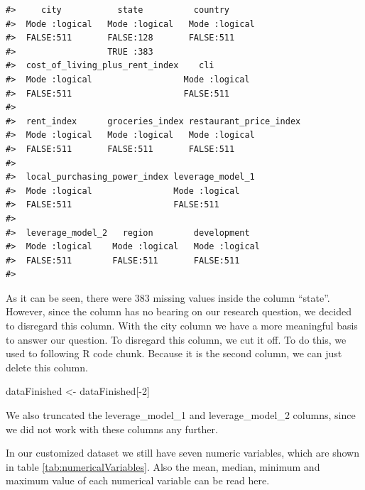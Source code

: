 \documentclass[
  11pt,
  a4paper,
  twoside]{scrbook}
\newenvironment{Shaded}{\begin{snugshade}}{\end{snugshade}}
\newcommand{\DecValTok}[1]{\textcolor[rgb]{0.00,0.00,0.81}{#1}}
\newcommand{\NormalTok}[1]{#1}
\newcommand{\OtherTok}[1]{\textcolor[rgb]{0.56,0.35,0.01}{#1}}
\newcommand{\SpecialCharTok}[1]{\textcolor[rgb]{0.00,0.00,0.00}{#1}}
\begin{document}
\begin{verbatim}
#>     city           state          country       
#>  Mode :logical   Mode :logical   Mode :logical  
#>  FALSE:511       FALSE:128       FALSE:511      
#>                  TRUE :383                      
#>  cost_of_living_plus_rent_index    cli         
#>  Mode :logical                  Mode :logical  
#>  FALSE:511                      FALSE:511      
#>                                                
#>  rent_index      groceries_index restaurant_price_index
#>  Mode :logical   Mode :logical   Mode :logical         
#>  FALSE:511       FALSE:511       FALSE:511             
#>                                                        
#>  local_purchasing_power_index leverage_model_1
#>  Mode :logical                Mode :logical   
#>  FALSE:511                    FALSE:511       
#>                                               
#>  leverage_model_2   region        development    
#>  Mode :logical    Mode :logical   Mode :logical  
#>  FALSE:511        FALSE:511       FALSE:511      
#> 
\end{verbatim}

As it can be seen, there were \(383\) missing values inside the column ``state''.
However, since the column has no bearing on our research question, we decided to disregard this column. With the city column we have a more meaningful basis to answer our question.
To disregard this column, we cut it off. To do this, we used to following R code chunk. Because it is the second column, we can just delete this column.

\linespread{1}

\begin{Shaded}
\begin{Highlighting}[]
\NormalTok{dataFinished }\OtherTok{\textless{}{-}}\NormalTok{ dataFinished[}\SpecialCharTok{{-}}\DecValTok{2}\NormalTok{]}
\end{Highlighting}
\end{Shaded}

\linespread{1}

We also truncated the leverage\_model\_1 and leverage\_model\_2 columns, since we did not work with these columns any further.

In our customized dataset we still have seven numeric variables, which are shown in table \ref{tab:numericalVariables}. Also the mean, median, minimum and maximum value of each numerical variable can be read here.

\linespread{1}
\end{document}
